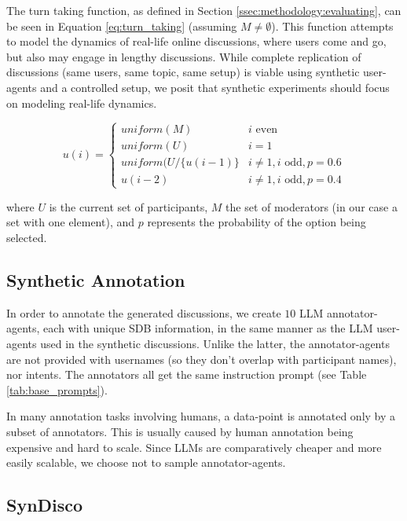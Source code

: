The turn taking function, as defined in Section \ref{ssec:methodology:evaluating}, can be seen in Equation \ref{eq:turn_taking} (assuming $M \neq \emptyset$). This function attempts to model the dynamics of real-life online discussions, where users come and go, but also may engage in lengthy discussions. While complete replication of discussions (same users, same topic, same setup) is viable using synthetic user-agents and a controlled setup, we posit that synthetic experiments should focus on modeling real-life dynamics.

\begin{equation}
\label{eq:turn_taking}
    u(i) = \left\{
\begin{array}{ll}
    \textit{uniform}(M) & i \text{ even}\\
    \textit{uniform}(U) & i=1\\
    \textit{uniform}(U/\{u(i-1)\} & i \neq 1, i \text{ odd}, p=0.6 \\
    u(i-2) & i \neq 1, i \text{ odd}, p=0.4 
\end{array} 
\right.
\end{equation}

\noindent where $U$ is the current set of participants, $M$ the set of moderators (in our case a set with one element), and $p$ represents the probability of the option being selected.


\subsection{Synthetic Annotation}

In order to annotate the generated discussions, we create $10$ \ac{LLM} annotator-agents, each with unique \ac{SDB} information, in the same manner as the \ac{LLM} user-agents used in the synthetic discussions. Unlike the latter, the annotator-agents are not provided with usernames (so they don't overlap with participant names), nor intents. The annotators all get the same instruction prompt (see Table \ref{tab:base_prompts}).

In many annotation tasks involving humans, a data-point is annotated only by a subset of annotators. This is usually caused by human annotation being expensive and hard to scale. Since \acp{LLM} are comparatively cheaper and more easily scalable, we choose not to sample annotator-agents.


\subsection{SynDisco}

